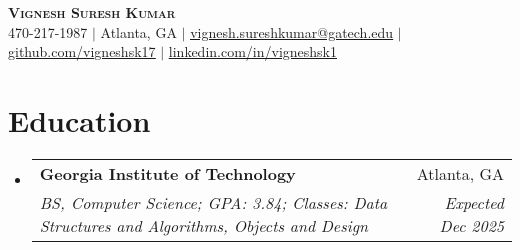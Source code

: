 \documentclass[letterpaper,11pt]{article}
\makeatletter
\newcommand{\resumeItem}[1]{
  \item\small{
    {#1 \vspace{-2pt}}
  }
}
\newcommand{\resumeSubheading}[4]{%
\vspace{-1pt}%
  \item
    \begin{tabular*}{0.97\textwidth}{l@{\extracolsep{\fill}}r}
      \textbf{#1} & #2 \\
      \textit{\small#3} & \textit{\small #4} \\

    \end{tabular*}%
  \vspace{-9pt}
}
\newcommand{\resumeSubSubheading}[2]{
    \item
    \begin{tabular*}{0.97\textwidth}{l@{\extracolsep{\fill}}r}
      \textit{\small#1} & \textit{\small #2} \\
    \end{tabular*}\vspace{-7pt}
}
\newcommand{\resumeSubHeadingListStart}{\begin{itemize}[leftmargin=0.15in, label={}]}
\newcommand{\resumeSubHeadingListEnd}{\end{itemize}}
\newcommand{\resumeItemListStart}{\begin{itemize}}
\newcommand{\resumeItemListEnd}{\end{itemize}\vspace{-5pt}}
\makeatother
\begin{document}

\begin{center}
    \textbf{\Huge \scshape Vignesh Suresh Kumar} \\ \vspace{1pt}
    \small 470-217-1987 $|$ \small Atlanta, GA $|$
    \href{mailto:vignesh.sureshkumar@gatech.edu}{\underline{vignesh.sureshkumar@gatech.edu}} $|$
    \href{https://github.com/VigneshSK17}{\underline{github.com/vigneshsk17}} $|$
    \href{https://www.linkedin.com/in/vigneshsk1}{\underline{linkedin.com/in/vigneshsk1}}
\end{center}


\section{Education}
  \resumeSubHeadingListStart
    \resumeSubheading
      {Georgia Institute of Technology}{Atlanta, GA}
      {BS, Computer Science; GPA: 3.84; Classes: Data Structures and Algorithms, Objects and Design}{Expected Dec 2025}
  \resumeSubHeadingListEnd




\end{document}

